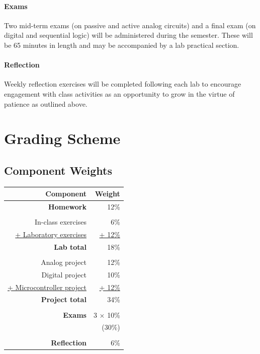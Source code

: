 \documentclass{syllabus}
\begin{document}
\paragraph{Exams} 
Two mid-term exams (on passive and active analog circuits) and a final exam (on digital and sequential logic) will be administered during the semester. These will be 65 minutes in length and may be accompanied by a lab practical section.

\paragraph{Reflection} 
Weekly reflection exercises will be completed following each lab to encourage engagement with class activities as an opportunity to grow in the virtue of patience as outlined above.


\section*{Grading Scheme}
\subsection*{Component Weights}

\noindent\begin{tabular}{rr}
\textbf{Component}      & \textbf{Weight}       \\ \hline
\textbf{Homework}       & 12\%  \\ \\
In-class exercises       & 6\%       \\
\underline{+ Laboratory exercises}       & \underline{+ 12\%}       \\
\textbf{Lab total}       & 18\%       \\ \\
Analog project       & 12\%       \\
Digital project       & 10\%       \\
\underline{+ Microcontroller project}       & \underline{+ 12\%}       \\
\textbf{Project total}       & 34\%       \\ \\
\textbf{Exams}          & 3 $\times$ 10\% \\
                        & (30\%) \\ \\
\textbf{Reflection}     & 6\%
\end{tabular}%
\end{document}
